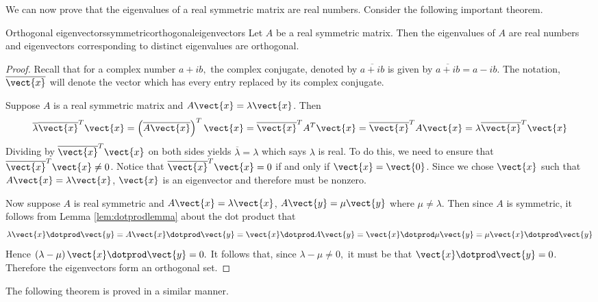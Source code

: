 We can now prove that the eigenvalues of a real symmetric matrix are real numbers.  Consider the following important theorem. 

\begin{theorem}{Orthogonal eigenvectors}{symmetricorthogonaleigenvectors}
Let $A$ be a real symmetric matrix. Then the eigenvalues of $A$ are real numbers and eigenvectors corresponding to distinct eigenvalues are orthogonal. 
\end{theorem}

\begin{proof}
Recall that for a complex number $a+ib,$ the complex conjugate, denoted by $
\overline{a+ib}$ is given by $\overline{a+ib}=a-ib.$ The
notation, $\overline{\vect{x}}$ will denote the vector which has every
entry replaced by its complex conjugate.

Suppose $A$ is a real symmetric matrix and $A\vect{x}=\lambda \vect{x}$.
Then 
\begin{equation*}
\overline{\lambda }\overline{\vect{x}}^{T}\vect{x}=\left( \overline{A
\vect{x}}\right) ^{T}\vect{x}=\overline{\vect{x}}^{T}A^{T}\vect{x}=
\overline{\vect{x}}^{T}A\vect{x}=\lambda \overline{\vect{x}}^{T}
\vect{x}
\end{equation*}
Dividing by $\overline{\vect{x}}^{T}\vect{x}$ on both sides yields $
\overline{\lambda }=\lambda $ which says $\lambda $ is real. To do this, we need to ensure that $\overline{\vect{x}}^{T}\vect{x} \neq 0$. Notice that $\overline{\vect{x}}^{T}\vect{x} = 0$ if and only if $\vect{x} = \vect{0}$. Since we chose $\vect{x}$ such that $A\vect{x} = \lambda \vect{x}$, $\vect{x}$ is an eigenvector and therefore must be nonzero.  

Now suppose $A$ is real symmetric and $A\vect{x}=\lambda \vect{x}$, $A
\vect{y}=\mu \vect{y}$ where $\mu \neq \lambda$. Then since $A$
is symmetric, it follows from Lemma \ref{lem:dotprodlemma} about the dot product that 
\begin{equation*}
\lambda \vect{x}\dotprod \vect{y}=A\vect{x}\dotprod \vect{y}=\vect{x}\dotprod A\vect{y}=\vect{x}\dotprod \mu \vect{y}=\mu \vect{x}\dotprod \vect{y}
\end{equation*}
Hence $\left( \lambda -\mu \right) \vect{x}\dotprod \vect{y}=0.$ It follows that,
since $\lambda -\mu \neq 0,$ it must be that $\vect{x}\dotprod \vect{y}=0$. Therefore the eigenvectors form an orthogonal set. 
\end{proof}

The following theorem is proved in a similar manner.

